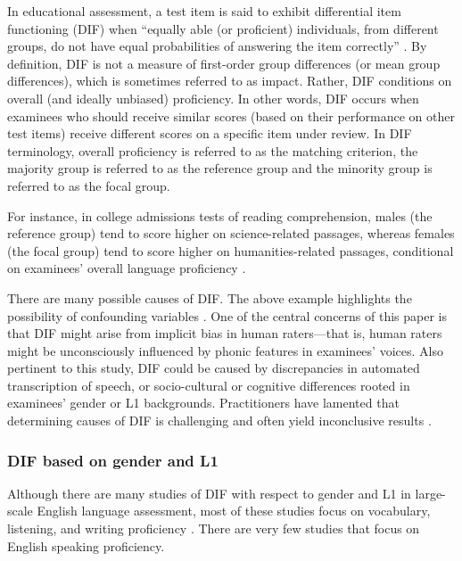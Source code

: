 \documentclass [PhD] {uclathes}
\begin{document}
In educational assessment, a test item is said to exhibit differential item functioning (DIF) when “equally able (or proficient) individuals, from different groups, do not have equal probabilities of answering the item correctly” \citep[][p. 4]{angoff1993}. By definition, DIF is not a measure of first-order group differences (or mean group differences), which is sometimes referred to as impact. Rather, DIF conditions on overall (and ideally unbiased) proficiency. In other words, DIF occurs when examinees who should receive similar scores (based on their performance on other test items) receive different scores on a specific item under review. In DIF terminology, overall proficiency is referred to as the matching criterion, the majority group is referred to as the reference group and the minority group is referred to as the focal group.

For instance, in college admissions tests of reading comprehension, males (the reference group) tend to score higher on science-related passages, whereas females (the focal group) tend to score higher on humanities-related passages, conditional on examinees’ overall language proficiency \citep[the matching criterion;][]{steedle2023}. 

There are many possible causes of DIF. The above example highlights the possibility of confounding variables \citep[e.g. males tend to major in STEM at a higher rate;][]{sloane2021college}. One of the central concerns of this paper is that DIF might arise from implicit bias in human raters—that is, human raters might be unconsciously influenced by phonic features in examinees’ voices. Also pertinent to this study, DIF could be caused by discrepancies in automated transcription of speech, or socio-cultural or cognitive differences rooted in examinees’ gender or L1 backgrounds. Practitioners have lamented that determining causes of DIF is challenging and often yield inconclusive results \citep{zumbo2007}. 

\subsubsection{DIF based on gender and L1}

Although there are many studies of DIF with respect to gender and L1 in large-scale English language assessment, most of these studies focus on vocabulary, listening, and writing proficiency \citep{kunnan2017evaluating}. There are very few studies that focus on English speaking proficiency. 
\end{document}
